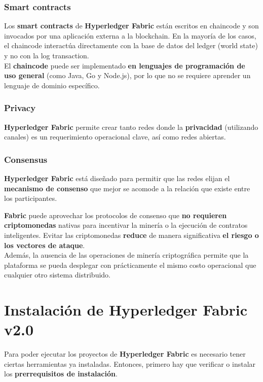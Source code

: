 \documentclass{beamer}
\begin{document}
	\begin{frame}
		\frametitle{Smart contracts}
		Los \textbf{smart contracts} de \textbf{Hyperledger Fabric} están escritos en chaincode y son invocados por una aplicación externa a la blockchain. En la mayoría de los casos, el chaincode interactúa directamente con la base de datos del ledger (world state) y no con la log transaction.\\
		\vspace{4mm}
		El \textbf{chaincode} puede ser implementado \textbf{en lenguajes de programación de uso general} (como Java, Go y Node.js), por lo que no se requiere aprender un lenguaje de dominio específico.\\
	\end{frame}

	\begin{frame}
		\frametitle{Privacy}
		\textbf{Hyperledger Fabric} permite crear tanto redes donde la \textbf{privacidad} (utilizando canales) es un requerimiento operacional clave, así como redes abiertas.
	\end{frame}
	
	\begin{frame}
		\frametitle{Consensus}
		\textbf{Hyperledger Fabric} está diseñado para permitir que las redes elijan el \textbf{mecanismo de consenso} que mejor se acomode a la relación que existe entre los participantes.
	\end{frame}
		
	\begin{frame}
		\textbf{Fabric} puede aprovechar los protocolos de consenso que \textbf{no requieren criptomonedas} nativas para incentivar la minería o la ejecución de contratos inteligentes. Evitar las criptomonedas \textbf{reduce} de manera significativa \textbf{el riesgo o los vectores de ataque}.\\
		\vspace{4mm}
		Además, la ausencia de las operaciones de minería criptográfica permite que la plataforma se pueda desplegar con prácticamente el mismo costo operacional que cualquier otro sistema distribuido. 
	\end{frame}
	
	\section{Instalación de Hyperledger Fabric v2.0}
	
	\begin{frame}
		Para poder ejecutar los proyectos de \textbf{Hyperledger Fabric} es necesario tener ciertas herramientas ya instaladas. Entonces, primero hay que verificar o instalar los \textbf{prerrequisitos de instalación}.
	\end{frame}
	
\end{document}
